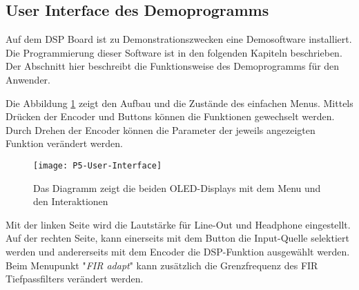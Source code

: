 \subsection{User Interface des Demoprogramms}
\label{sec:GUI-Manual}

Auf dem DSP Board ist zu Demonstrationszwecken eine Demosoftware installiert.
Die Programmierung dieser Software ist in den folgenden Kapiteln beschrieben.
Der Abschnitt hier beschreibt die Funktionsweise des Demoprogramms für den Anwender.

Die Abbildung \ref{pic:P5-User-Interface} zeigt den Aufbau und die Zustände des einfachen Menus. Mittels Drücken der Encoder und Buttons können die Funktionen gewechselt werden.
Durch Drehen der Encoder können die Parameter der jeweils angezeigten Funktion verändert werden.

\begin{figure}[H]
	\centering
	\texttt{[image: P5-User-Interface]}
	\caption{Das Diagramm zeigt die beiden OLED-Displays mit dem Menu und den Interaktionen}
	\label{pic:P5-User-Interface}
\end{figure}

Mit der linken Seite wird die Lautstärke für Line-Out und Headphone eingestellt.
Auf der rechten Seite, kann einerseits mit dem Button die Input-Quelle selektiert werden und andererseits mit dem Encoder die DSP-Funktion ausgewählt werden. 
Beim Menupunkt "\textit{FIR adapt}" kann zusätzlich die Grenzfrequenz des FIR Tiefpassfilters verändert werden.




